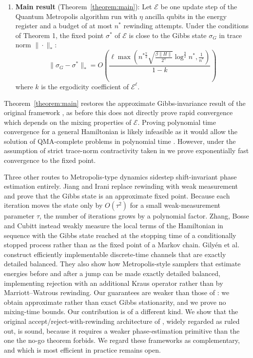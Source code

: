 \documentclass[aps,floatfix,10pt,amssymb,amsfont,amsmath,superscriptaddress,float,nofootinbib,longbibliography,nobalancelastpage,twocolumn]{revtex4-2}
\begin{document}
\begin{enumerate}
    \item \textbf{Main result} (Theorem~\ref{theorem:main}): Let $\mathcal{E}$ be one  update step of the Quantum Metropolis algorithm run with $\eta$ ancilla qubits in the energy register and a budget of at most $n^*$ rewinding attempts. Under the conditions of Theorem 1, the fixed point $\sigma^*$ of $\mathcal{E}$ is close to the Gibbs state $\sigma_G$ in trace norm $\|\cdot\|_*$:
    \begin{equation}
       \|\sigma_G- \sigma^*\|_* = O\left(\frac{\ell\max\left( n^{*\frac{7}{2}}\sqrt{\frac{\beta\|H\| }{2^{\eta}}}\log^{\frac{9}{2}}n^*,\frac{1}{n^*}\right)}{1-k}\right)
    \end{equation}
    where $k$ is the ergodicity coefficient of $\mathcal{E}^\ell$.
\end{enumerate}
Theorem~\ref{theorem:main} restores the approximate Gibbs-invariance result of the original framework \cite{Temme_2011}, as before this does not directly prove rapid convergence which depends on the mixing properties of $\mathcal{E}$. Proving polynomial time convergence for a general Hamiltonian is likely infeasible as it would allow the solution of QMA-complete problems in polynomial time \cite{kempe2006complexity}. However, under the assumption of strict trace-norm contractivity taken in \cite{Temme_2011} we prove exponentially fast convergence to the fixed point.

Three other routes to Metropolis-type dynamics sidestep shift-invariant phase estimation entirely. Jiang and Irani \cite{jiang2024quantummetropolissamplingweak} replace rewinding with weak measurement and prove that the Gibbs state is an approximate fixed point. Because each iteration moves the state only by $O(\tau^2)$ for a small weak-measurement parameter $\tau$, the number of iterations grows by a polynomial factor. Zhang, Bosse and Cubitt \cite{zhang2023dissipative} instead weakly measure the local terms of the Hamiltonian in sequence with the Gibbs state reached at the stopping time of a conditionally stopped process rather than as the fixed point of a Markov chain. Gilyén et al. \cite{gilyen2024quantum} construct efficiently implementable discrete-time channels that are exactly detailed balanced. They also show how Metropolis-style samplers that estimate energies before and after a jump can be made exactly detailed balanced, implementing rejection with an additional Kraus operator rather than by Marriott–Watrous rewinding. Our guarantees are weaker than those of \cite{gilyen2024quantum}: we obtain approximate rather than exact Gibbs stationarity, and we prove no mixing-time bounds. Our contribution is of a different kind. We show that the original accept/reject-with-rewinding architecture of \cite{Temme_2011}, widely regarded as ruled out, is sound, because it requires a weaker phase-estimation primitive than the one the no-go theorem \cite{chen2023quantumthermalstatepreparation} forbids. We regard these frameworks as complementary, and which is most efficient in practice remains open.
\end{document}
